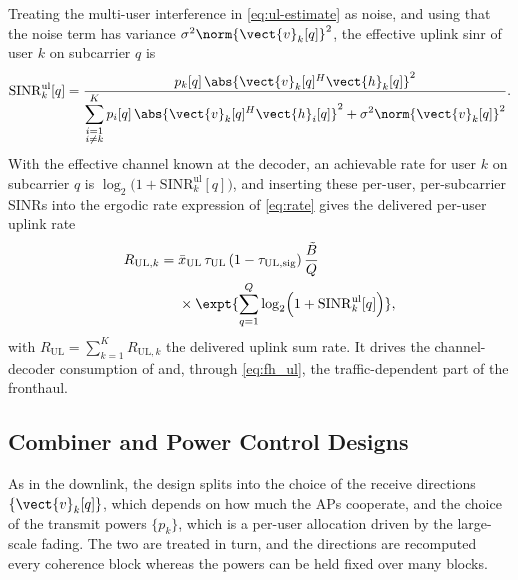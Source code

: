 Treating the multi-user interference in \eqref{eq:ul-estimate} as noise, and
using that the noise term has variance
$\sigma^{2}\norm{\vect{v}_{k}[q]}^{2}$, the effective uplink \gls{sinr} of user
$k$ on subcarrier $q$ is
\begin{equation}
\label{eq:ul-sinr}
\mathrm{SINR}_{k}^{\mathrm{ul}}[q] =
\frac{p_{k}[q]\,\abs{\vect{v}_{k}[q]^{H}\vect{h}_{k}[q]}^{2}}
{\displaystyle\sum_{\substack{i=1 \\ i\neq k}}^{K}
p_{i}[q]\,\abs{\vect{v}_{k}[q]^{H}\vect{h}_{i}[q]}^{2}
+ \sigma^{2}\norm{\vect{v}_{k}[q]}^{2}} .
\end{equation}
With the effective channel known at the decoder, an achievable rate for user $k$ on subcarrier $q$ is
$\log_{2}\!\big(1+\mathrm{SINR}_{k}^{\mathrm{ul}}[q]\big)$, and inserting these
per-user, per-subcarrier SINRs into the ergodic rate expression of
 \eqref{eq:rate} gives the delivered per-user uplink rate
\begin{align}
\label{eq:ul-rate-user}
R_{\mathrm{UL},k} ={}& \bar x_{\mathrm{UL}}\,\tau_{\mathrm{UL}}\,
(1-\tau_{\mathrm{UL,sig}})\,\frac{\tilde B}{Q} \nonumber\\
&\times \expt{\sum_{q=1}^{Q}\log_{2}\!\left(1
+\mathrm{SINR}_{k}^{\mathrm{ul}}[q]\right)},
\end{align}
with $R_{\mathrm{UL}}=\sum_{k=1}^{K}R_{\mathrm{UL},k}$ the delivered uplink sum
rate. It drives the channel-decoder consumption of  and, through
\eqref{eq:fh_ul}, the traffic-dependent part of the fronthaul.


\subsection{Combiner and Power Control Designs}
\label{ssec:ul_designs}

As in the downlink, the design splits into the choice of the receive directions
$\{\vect{v}_{k}[q]\}$, which depends on how much the APs cooperate, and the
choice of the transmit powers $\{p_{k}\}$, which is a per-user allocation driven
by the large-scale fading. The two are treated in turn, and the directions are
recomputed every coherence block whereas the powers can be held fixed over many
blocks.


